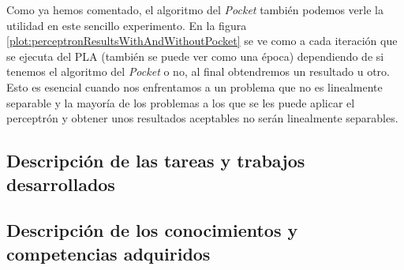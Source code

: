 Como ya hemos comentado, el algoritmo del \textit{Pocket} también podemos verle la utilidad en este sencillo experimento. En la figura \ref{plot:perceptronResultsWithAndWithoutPocket} se ve como a cada iteración que se ejecuta del PLA (también se puede ver como una época) dependiendo de si tenemos el algoritmo del \textit{Pocket} o no, al final obtendremos un resultado u otro. Esto es esencial cuando nos enfrentamos a un problema que no es linealmente separable y la mayoría de los problemas a los que se les puede aplicar el perceptrón y obtener unos resultados aceptables no serán linealmente separables.

\newpage
\subsection{Descripción de las tareas y trabajos desarrollados}


\newpage
\subsection{Descripción de los conocimientos y competencias adquiridos}


\newpage